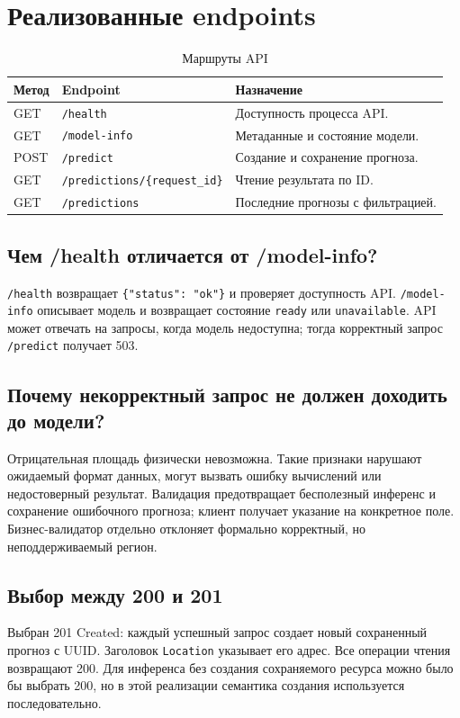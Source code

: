 \documentclass[12pt,a4paper]{article}
\begin{document}
\section{Реализованные endpoints}
\begin{table}[H]
\centering\caption{Маршруты API}
\begin{tabularx}{\textwidth}{|l|p{5.6cm}|X|}\hline
Метод & Endpoint & Назначение \\\hline
GET & \texttt{/health} & Доступность процесса API. \\\hline
GET & \texttt{/model-info} & Метаданные и состояние модели. \\\hline
POST & \texttt{/predict} & Создание и сохранение прогноза. \\\hline
GET & \texttt{/predictions/}\newline\texttt{\{request\_id\}} & Чтение результата по ID. \\\hline
GET & \texttt{/predictions} & Последние прогнозы с фильтрацией. \\\hline
\end{tabularx}
\end{table}
\subsection{Чем /health отличается от /model-info?}
\texttt{/health} возвращает \texttt{\{"status": "ok"\}} и проверяет доступность API. \texttt{/model-info} описывает модель и возвращает состояние \texttt{ready} или \texttt{unavailable}. API может отвечать на запросы, когда модель недоступна; тогда корректный запрос \texttt{/predict} получает 503.

\subsection{Почему некорректный запрос не должен доходить до модели?}
Отрицательная площадь физически невозможна. Такие признаки нарушают ожидаемый формат данных, могут вызвать ошибку вычислений или недостоверный результат. Валидация предотвращает бесполезный инференс и сохранение ошибочного прогноза; клиент получает указание на конкретное поле. Бизнес-валидатор отдельно отклоняет формально корректный, но неподдерживаемый регион.

\subsection{Выбор между 200 и 201}
Выбран 201 Created: каждый успешный запрос создает новый сохраненный прогноз с UUID. Заголовок \texttt{Location} указывает его адрес. Все операции чтения возвращают 200. Для инференса без создания сохраняемого ресурса можно было бы выбрать 200, но в этой реализации семантика создания используется последовательно.
\end{document}
